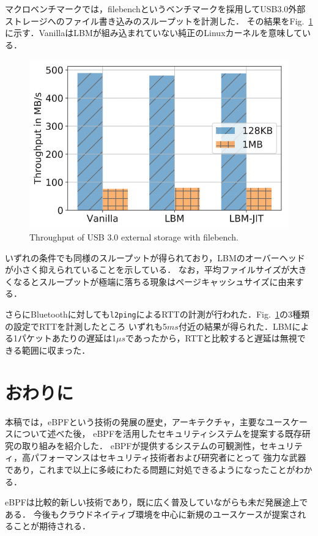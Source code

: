\documentclass[platex,a4j,10pt,twoside,twocolumn,dvipdfmx]{jsarticle}
\newcommand{\Fref}[1]{Fig.~\ref{#1}}
\begin{document}
      マクロベンチマークでは，filebenchというベンチマークを採用してUSB3.0外部ストレージへのファイル書き込みのスループットを計測した．
      その結果を\Fref{img:file-bench}に示す．VanillaはLBMが組み込まれていない純正のLinuxカーネルを意味している．
      \begin{figure}[tp]
        \begin{center}
          \includegraphics[width=\columnwidth]{./img/macro-graph.png}
        \end{center}
        \caption{Throughput of USB 3.0 external storage with filebench. \cite{tian2019lbm}}
        \label{img:file-bench}
      \end{figure}
      いずれの条件でも同様のスループットが得られており，LBMのオーバーヘッドが小さく抑えられていることを示している．
      なお，平均ファイルサイズが大きくなるとスループットが極端に落ちる現象はページキャッシュサイズに由来する．
      
      さらにBluetoothに対しても\texttt{l2ping}によるRTTの計測が行われた．\Fref{img:file-bench}の3種類の設定でRTTを計測したところ
      いずれも5$ms$付近の結果が得られた．LBMによる1パケットあたりの遅延は1$\mu s$であったから，RTTと比較すると遅延は無視できる範囲に収まった．

\section{おわりに}
  本稿では，eBPFという技術の発展の歴史，アーキテクチャ，主要なユースケースについて述べた後，
  eBPFを活用したセキュリティシステムを提案する既存研究の取り組みを紹介した．
  eBPFが提供するシステムの可観測性，セキュリティ，高パフォーマンスはセキュリティ技術者および研究者にとって
  強力な武器であり，これまで以上に多岐にわたる問題に対処できるようになったことがわかる．

  eBPFは比較的新しい技術であり，既に広く普及していながらも未だ発展途上である．
  今後もクラウドネイティブ環境を中心に新規のユースケースが提案されることが期待される．


{
\footnotesize

}
\end{document}
